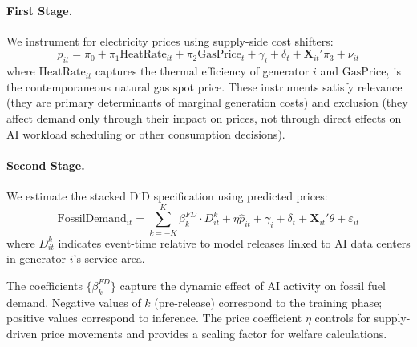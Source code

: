 \documentclass[a4paper,fleqn,longmktitle]{cas-sc}
\theoremstyle{plain}
\theoremstyle{definition}
\begin{document}
\paragraph{First Stage.} We instrument for electricity prices using supply-side cost shifters:
\begin{equation}
p_{it} = \pi_0 + \pi_1 \text{HeatRate}_{it} + \pi_2 \text{GasPrice}_{t} + \gamma_i + \delta_t + \mathbf{X}_{it}'\pi_3 + \nu_{it}
\label{eq:firststage}
\end{equation}
where $\text{HeatRate}_{it}$ captures the thermal efficiency of generator $i$ and $\text{GasPrice}_t$ is the contemporaneous natural gas spot price. These instruments satisfy relevance (they are primary determinants of marginal generation costs) and exclusion (they affect demand only through their impact on prices, not through direct effects on AI workload scheduling or other consumption decisions).

\paragraph{Second Stage.} We estimate the stacked DiD specification using predicted prices:
\begin{equation}
\text{FossilDemand}_{it} = \sum_{k=-K}^{K} \beta_k^{FD} \cdot D_{it}^k + \eta \hat{p}_{it} + \gamma_i + \delta_t + \mathbf{X}_{it}'\theta + \varepsilon_{it}
\label{eq:demand_eventstudy}
\end{equation}
where $D_{it}^k$ indicates event-time relative to model releases linked to AI data centers in generator $i$'s service area.

The coefficients $\{\beta_k^{FD}\}$ capture the dynamic effect of AI activity on fossil fuel demand. Negative values of $k$ (pre-release) correspond to the training phase; positive values correspond to inference. The price coefficient $\eta$ controls for supply-driven price movements and provides a scaling factor for welfare calculations. 


\end{document}
